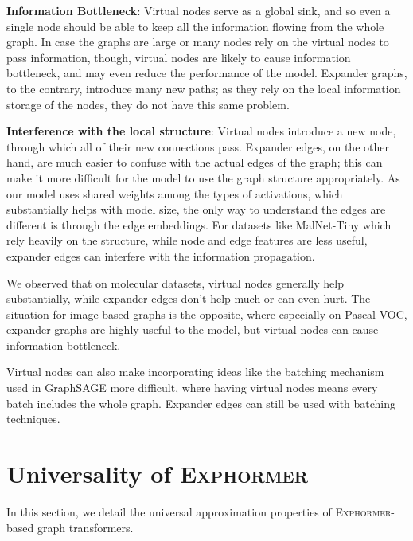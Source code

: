 \documentclass{article}
\theoremstyle{plain}
\theoremstyle{definition}
\theoremstyle{remark}
\begin{document}
\textbf{Information Bottleneck}: Virtual nodes serve as a global sink, and so even a single node should be able to keep all the information flowing from the whole graph. In case the graphs are large or many nodes rely on the virtual nodes to pass information, though, virtual nodes are likely to cause information bottleneck, and may even reduce the performance of the model. Expander graphs, to the contrary, introduce many new paths; as they rely on the local information storage of the nodes, they do not have this same problem.

\textbf{Interference with the local structure}: Virtual nodes introduce a new node, through which all of their new connections pass. Expander edges, on the other hand, are much easier to confuse with the actual edges of the graph; this can make it more difficult for the model to use the graph structure appropriately. As our model uses shared weights among the types of activations, which substantially helps with model size, the only way to understand the edges are different is through the edge embeddings. For datasets like MalNet-Tiny which rely heavily on the structure, while node and edge features are less useful, expander edges can interfere with the information propagation.

We observed that on molecular datasets,
virtual nodes generally help substantially,
while expander edges don't help much or can even hurt.
The situation for image-based graphs is the opposite,
where especially on Pascal-VOC, expander graphs are highly useful to the model,
but virtual nodes can cause information bottleneck.

Virtual nodes can also make incorporating ideas like the batching mechanism used in GraphSAGE \citep{hamilton2017inductive} more difficult, where having virtual nodes means every batch includes the whole graph. Expander edges can still be used with batching techniques.


\section{Universality of \textsc{Exphormer}} \label{sec:proofs}
In this section, we detail the universal approximation properties of \textsc{Exphormer}-based graph transformers.
\end{document}
